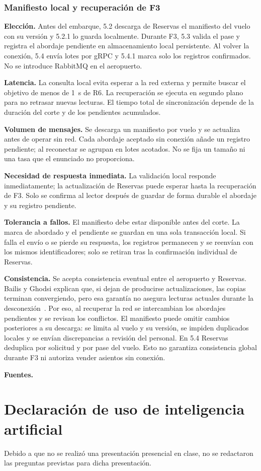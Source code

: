\documentclass[11pt,a4paper]{article}
\newcommand{\decision}[8]{\subsubsection*{#1}%
  \textbf{Elección.} #2\par
  \textbf{Latencia.} #3\par
  \textbf{Volumen de mensajes.} #4\par
  \textbf{Necesidad de respuesta inmediata.} #5\par
  \textbf{Tolerancia a fallos.} #6\par
  \textbf{Consistencia.} #7\par
  \textbf{Fuentes.} #8\par}
\begin{document}
\decision{Manifiesto local y recuperación de F3}
 {Antes del embarque, 5.2 descarga de Reservas el manifiesto del vuelo con su versión y 5.2.1 lo guarda localmente. Durante F3, 5.3 valida el pase y registra el abordaje pendiente en almacenamiento local persistente. Al volver la conexión, 5.4 envía lotes por gRPC y 5.4.1 marca solo los registros confirmados. No se introduce RabbitMQ en el aeropuerto.}
 {La consulta local evita esperar a la red externa y permite buscar el objetivo de menos de 1~s de R6. La recuperación se ejecuta en segundo plano para no retrasar nuevas lecturas. El tiempo total de sincronización depende de la duración del corte y de los pendientes acumulados.}
 {Se descarga un manifiesto por vuelo y se actualiza antes de operar sin red. Cada abordaje aceptado sin conexión añade un registro pendiente; al reconectar se agrupan en lotes acotados. No se fija un tamaño ni una tasa que el enunciado no proporciona.}
 {La validación local responde inmediatamente; la actualización de Reservas puede esperar hasta la recuperación de F3. Solo se confirma al lector después de guardar de forma durable el abordaje y su registro pendiente.}
 {El manifiesto debe estar disponible antes del corte. La marca de abordado y el pendiente se guardan en una sola transacción local. Si falla el envío o se pierde su respuesta, los registros permanecen y se reenvían con los mismos identificadores; solo se retiran tras la confirmación individual de Reservas.}
 {Se acepta consistencia eventual entre el aeropuerto y Reservas. Bailis y Ghodsi explican que, si dejan de producirse actualizaciones, las copias terminan convergiendo, pero esa garantía no asegura lecturas actuales durante la desconexión~\cite{bailis2013eventual}. Por eso, al recuperar la red se intercambian los abordajes pendientes y se revisan los conflictos. El manifiesto puede omitir cambios posteriores a su descarga: se limita al vuelo y su versión, se impiden duplicados locales y se envían discrepancias a revisión del personal. En 5.4 Reservas deduplica por solicitud y por pase del vuelo. Esto no garantiza consistencia global durante F3 ni autoriza vender asientos sin conexión.}
 {\cite{bailis2013eventual,grpcConcepts}}

\section{Declaración de uso de inteligencia artificial}\label{sec:declaracion-ia}
Debido a que no se realizó una presentación presencial en clase, no se redactaron las preguntas previstas para dicha presentación.
\end{document}
